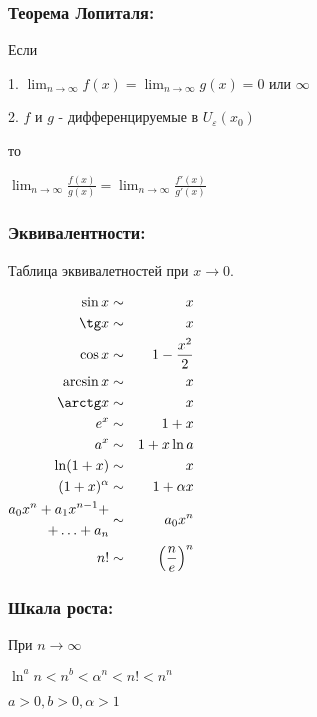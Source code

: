 \subsubsection{Теорема Лопиталя:}

Если

1. $\displaystyle \lim_{n\to \infty} f(x) = \lim_{n\to \infty} g(x) = 0 \text{ или } \infty $

2. $\displaystyle f $ и $\displaystyle g $ - дифференцируемые в $\displaystyle U_\varepsilon(x_0) $

то

$\displaystyle \lim_{n\to \infty} \frac{f(x)}{g(x)} = \lim_{n\to \infty} \frac{f'(x)}{g'(x)} $

\subsubsection{Эквивалентности:}

Таблица эквивалетностей при $\displaystyle x\to 0 $.

$\displaystyle \begin{aligned}
	\sin x & \sim & x \\
	\tg x & \sim & x \\
	\cos x & \sim & 1 - \frac{x^2}{2} \\
	\arcsin x & \sim & x \\
	\arctg x & \sim & x \\
	e^x & \sim & 1 + x \\
	a^x & \sim & 1 + x\ln a \\
	\ln (1 + x) & \sim & x \\
	(1+x)^\alpha & \sim & 1 + \alpha x \\
	\begin{aligned}
		a_0 x^n + a_1 x^{n-1} + \\
		+ \ldots + a_n
	\end{aligned} & \sim & a_0 x^n \\
	n! & \sim & \left(\frac{n}{e}\right)^n 
\end{aligned} $

\subsubsection{Шкала роста:}

При $\displaystyle n\to\infty $

$\displaystyle \ln^a n < n^b < \alpha^n < n! < n^n $

$\displaystyle a > 0, b > 0, \alpha > 1 $

